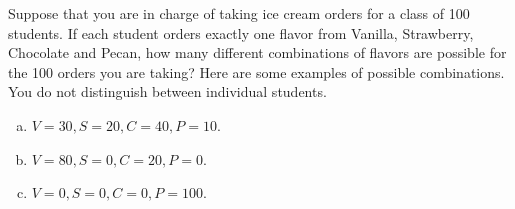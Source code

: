 Suppose that you are in charge of taking ice cream orders for a class of 100
students. If each student orders exactly one flavor from Vanilla, Strawberry,
Chocolate and Pecan, how many different combinations of flavors are possible
for the 100 orders you are taking? Here are some examples of possible
combinations. You do not distinguish between individual students.

\begin{enumerate}[(a)]
\item $V = 30, S = 20, C = 40, P = 10$.
\item $V = 80, S = 0, C = 20, P = 0$.
\item $V = 0, S = 0, C = 0, P = 100$.
\end{enumerate}
